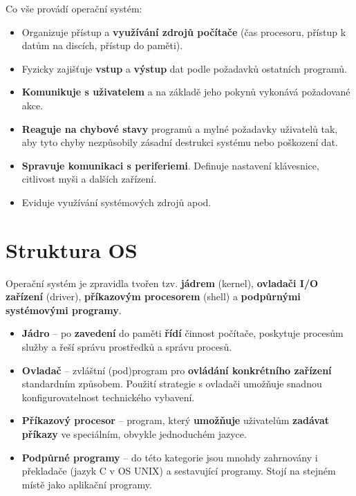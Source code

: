 Co vše provádí operační systém:
\begin{itemize}
    \item Organizuje přístup a \textbf{využívání zdrojů počítače }(čas procesoru, přístup k datům na discích, přístup do paměti).
    \item Fyzicky zajišťuje \textbf{vstup} a \textbf{výstup} dat podle požadavků ostatních programů.
    \item\textbf{ Komunikuje s uživatelem} a na základě jeho pokynů vykonává požadované akce.
    \item \textbf{Reaguje na chybové stavy} programů a mylné požadavky uživatelů tak, aby tyto chyby nezpůsobily zásadní destrukci systému nebo poškození dat.
    \item \textbf{Spravuje komunikaci s periferiemi}. Definuje nastavení klávesnice, citlivost myši a dalších zařízení.
    \item Eviduje využívání systémových zdrojů apod.
\end{itemize}

\section{Struktura OS}
Operační systém je zpravidla tvořen tzv. \textbf{jádrem} (kernel), \textbf{ovladači I/O zařízení} (driver), \textbf{příkazovým procesorem} (shell) a \textbf{podpůrnými systémovými programy}.
\begin{itemize}
    \item \textbf{Jádro} -- po \textbf{zavedení} do paměti \textbf{řídí} činnost počítače, poskytuje procesům služby a řeší správu prostředků a správu procesů.
    \item \textbf{Ovladač} -- zvláštní (pod)program pro \textbf{ovládání konkrétního zařízení} standardním způsobem. Použití strategie s ovladači umožňuje snadnou konfigurovatelnost technického vybavení.
    \item \textbf{Příkazový procesor} -- program, který \textbf{umožňuje} uživatelům \textbf{zadávat příkazy} ve speciálním, obvykle jednoduchém jazyce.
    \item \textbf{Podpůrné programy} -- do této kategorie jsou mnohdy zahrnovány i překladače (jazyk C v OS UNIX) a sestavující programy. Stojí na stejném místě jako aplikační programy.
\end{itemize}

